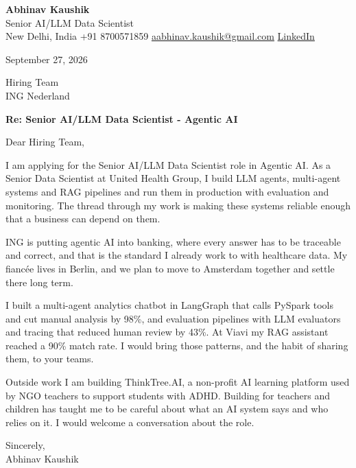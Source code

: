 \documentclass[11pt,a4paper]{article}
\begin{document}
{\Large\bfseries Abhinav Kaushik}\\
Senior AI/LLM Data Scientist\\
New Delhi, India \textbar{} +91 8700571859 \textbar{} \href{mailto:aabhinav.kaushik@gmail.com}{aabhinav.kaushik@gmail.com} \textbar{} \href{https://www.linkedin.com/in/abhinav-kaushik10/}{LinkedIn}  

September 27, 2026

Hiring Team\\
ING Nederland

\textbf{Re: Senior AI/LLM Data Scientist - Agentic AI}

Dear Hiring Team,

I am applying for the Senior AI/LLM Data Scientist role in Agentic AI. As a Senior Data Scientist at United Health Group, I build LLM agents, multi-agent systems and RAG pipelines and run them in production with evaluation and monitoring. The thread through my work is making these systems reliable enough that a business can depend on them.

ING is putting agentic AI into banking, where every answer has to be traceable and correct, and that is the standard I already work to with healthcare data. My fiancée lives in Berlin, and we plan to move to Amsterdam together and settle there long term.

I built a multi-agent analytics chatbot in LangGraph that calls PySpark tools and cut manual analysis by 98\%, and evaluation pipelines with LLM evaluators and tracing that reduced human review by 43\%. At Viavi my RAG assistant reached a 90\% match rate. I would bring those patterns, and the habit of sharing them, to your teams.

Outside work I am building ThinkTree.AI, a non-profit AI learning platform used by NGO teachers to support students with ADHD. Building for teachers and children has taught me to be careful about what an AI system says and who relies on it. I would welcome a conversation about the role.

Sincerely,\\[4pt]
Abhinav Kaushik
\end{document}
